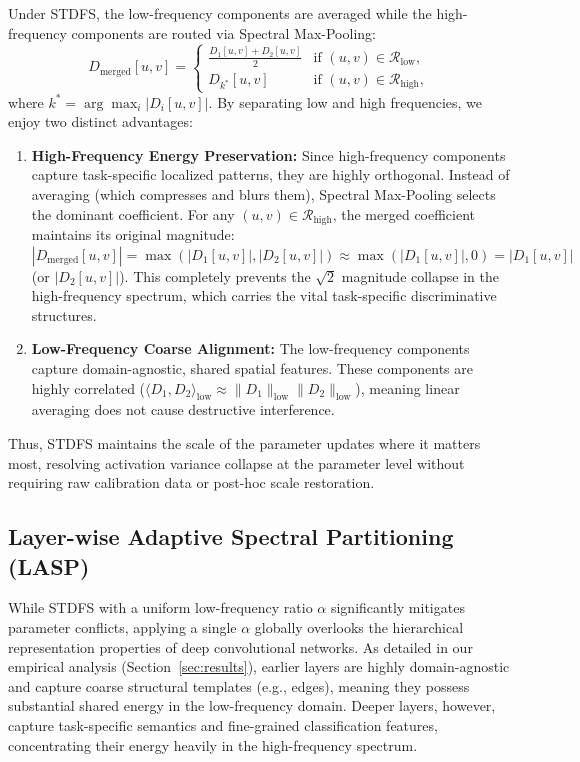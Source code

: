 \documentclass{article}
\theoremstyle{plain}
\theoremstyle{definition}
\theoremstyle{remark}
\begin{document}
Under STDFS, the low-frequency components are averaged while the high-frequency components are routed via Spectral Max-Pooling:
\begin{equation}
    D_{\text{merged}}[u,v] = 
    \begin{cases}
        \frac{D_1[u,v] + D_2[u,v]}{2} & \text{if } (u,v) \in \mathcal{R}_{\text{low}}, \\
        D_{k^*}[u,v] & \text{if } (u,v) \in \mathcal{R}_{\text{high}},
    \end{cases}
\end{equation}
where $k^* = \arg\max_{i} |D_i[u,v]|$.
By separating low and high frequencies, we enjoy two distinct advantages:
\begin{enumerate}\itemsep=1pt \topsep=1pt \parsep=0pt
    \item \textbf{High-Frequency Energy Preservation:} Since high-frequency components capture task-specific localized patterns, they are highly orthogonal. Instead of averaging (which compresses and blurs them), Spectral Max-Pooling selects the dominant coefficient. For any $(u, v) \in \mathcal{R}_{\text{high}}$, the merged coefficient maintains its original magnitude: $|D_{\text{merged}}[u,v]| = \max(|D_1[u,v]|, |D_2[u,v]|) \approx \max(|D_1[u,v]|, 0) = |D_1[u,v]|$ (or $|D_2[u,v]|$). This completely prevents the $\sqrt{2}$ magnitude collapse in the high-frequency spectrum, which carries the vital task-specific discriminative structures.
    \item \textbf{Low-Frequency Coarse Alignment:} The low-frequency components capture domain-agnostic, shared spatial features. These components are highly correlated ($\langle D_1, D_2 \rangle_{\text{low}} \approx \|D_1\|_{\text{low}}\|D_2\|_{\text{low}}$), meaning linear averaging does not cause destructive interference.
\end{enumerate}
Thus, STDFS maintains the scale of the parameter updates where it matters most, resolving activation variance collapse at the parameter level without requiring raw calibration data or post-hoc scale restoration.

\subsection{Layer-wise Adaptive Spectral Partitioning (LASP)}
While STDFS with a uniform low-frequency ratio $\alpha$ significantly mitigates parameter conflicts, applying a single $\alpha$ globally overlooks the hierarchical representation properties of deep convolutional networks. As detailed in our empirical analysis (Section~\ref{sec:results}), earlier layers are highly domain-agnostic and capture coarse structural templates (e.g., edges), meaning they possess substantial shared energy in the low-frequency domain. Deeper layers, however, capture task-specific semantics and fine-grained classification features, concentrating their energy heavily in the high-frequency spectrum.
\end{document}
